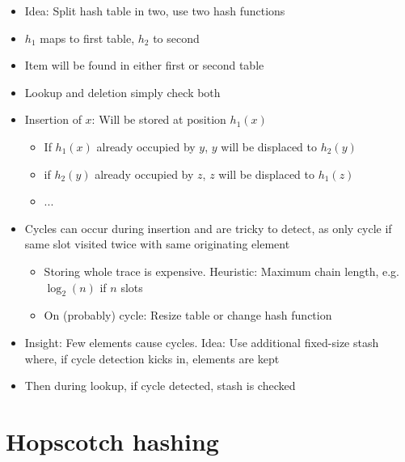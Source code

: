 \documentclass[a4paper]{scrreprt}
\begin{document}
\begin{itemize}
		\item Idea: Split hash table in two, use two hash functions
		\item $h_1$ maps to first table, $h_2$ to second
		\item Item will be found in either first or second table
		\item Lookup and deletion simply check both
		\item Insertion of $x$: Will be stored at position $h_1(x)$
				\begin{itemize}
						\item If $h_1(x)$ already occupied by $y$, $y$ will be displaced to $h_2(y)$
						\item if $h_2(y)$ already occupied by $z$, $z$ will be displaced to $h_1(z)$
						\item ...
				\end{itemize}
		\item Cycles can occur during insertion and are tricky to detect, as
				only cycle if same slot visited twice with same originating
				element
				\begin{itemize}
						\item Storing whole trace is expensive. Heuristic: Maximum chain
								length, e.g. $\log_2(n)$ if $n$ slots
						\item On (probably) cycle: Resize table or change hash function
				\end{itemize}
		\item Insight: Few elements cause cycles. Idea: Use additional
				fixed-size stash where, if cycle detection kicks in, elements
				are kept
		\item Then during lookup, if cycle detected, stash is checked
\end{itemize}

\section{Hopscotch hashing}
\end{document}
